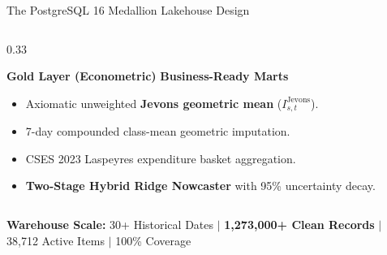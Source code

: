 \documentclass[aspectratio=169, 10pt]{beamer}
\begin{document}
\begin{frame}{The PostgreSQL 16 Medallion Lakehouse Design}
\begin{columns}
    \begin{column}{0.33\textwidth}
      \begin{alertblock}{\centering \textbf{Gold Layer (Econometric)}}
        \small
        \textbf{Business-Ready Marts}
        \begin{itemize}
          \item Axiomatic unweighted \textbf{Jevons geometric mean} ($I_{s,t}^{\text{Jevons}}$).
          \item 7-day compounded class-mean geometric imputation.
          \item CSES 2023 Laspeyres expenditure basket aggregation.
          \item \textbf{Two-Stage Hybrid Ridge Nowcaster} with 95\% uncertainty decay.
        \end{itemize}
      \end{alertblock}
    \end{column}
  \end{columns}

  \vspace{0.3cm}
  \begin{center}
    \small \textbf{Warehouse Scale:} 30+ Historical Dates $\vert$ \textbf{1,273,000+ Clean Records} $\vert$ 38,712 Active Items $\vert$ 100\% Coverage
  \end{center}
\end{frame}
\end{document}
